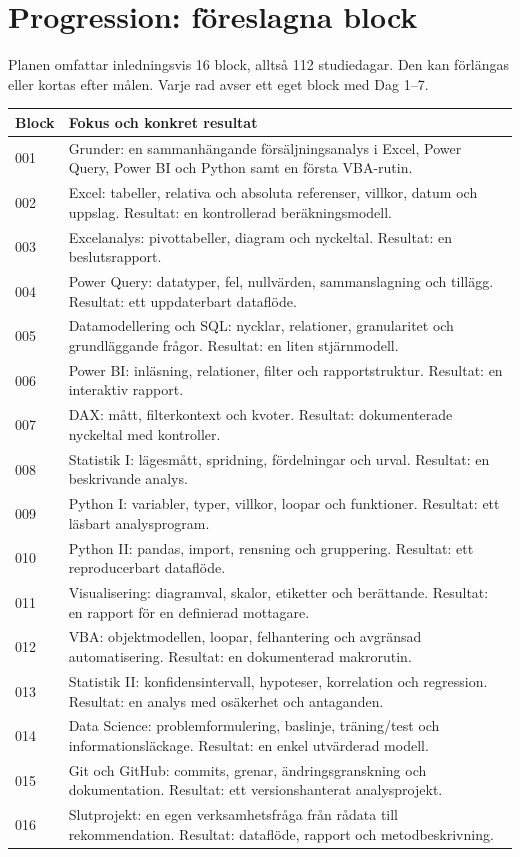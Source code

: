 \documentclass[11pt,a4paper]{article}
\begin{document}
\section{Progression: föreslagna block}
Planen omfattar inledningsvis 16 block, alltså 112 studiedagar. Den kan förlängas eller kortas efter målen. Varje rad avser ett eget block med Dag 1--7.
\begin{tabularx}{\textwidth}{@{}lX@{}}
\toprule
Block & Fokus och konkret resultat\\
\midrule
001 & Grunder: en sammanhängande försäljningsanalys i Excel, Power Query, Power BI och Python samt en första VBA-rutin.\\
002 & Excel: tabeller, relativa och absoluta referenser, villkor, datum och uppslag. Resultat: en kontrollerad beräkningsmodell.\\
003 & Excelanalys: pivottabeller, diagram och nyckeltal. Resultat: en beslutsrapport.\\
004 & Power Query: datatyper, fel, nullvärden, sammanslagning och tillägg. Resultat: ett uppdaterbart dataflöde.\\
005 & Datamodellering och SQL: nycklar, relationer, granularitet och grundläggande frågor. Resultat: en liten stjärnmodell.\\
006 & Power BI: inläsning, relationer, filter och rapportstruktur. Resultat: en interaktiv rapport.\\
007 & DAX: mått, filterkontext och kvoter. Resultat: dokumenterade nyckeltal med kontroller.\\
008 & Statistik I: lägesmått, spridning, fördelningar och urval. Resultat: en beskrivande analys.\\
009 & Python I: variabler, typer, villkor, loopar och funktioner. Resultat: ett läsbart analysprogram.\\
010 & Python II: pandas, import, rensning och gruppering. Resultat: ett reproducerbart dataflöde.\\
011 & Visualisering: diagramval, skalor, etiketter och berättande. Resultat: en rapport för en definierad mottagare.\\
012 & VBA: objektmodellen, loopar, felhantering och avgränsad automatisering. Resultat: en dokumenterad makrorutin.\\
013 & Statistik II: konfidensintervall, hypoteser, korrelation och regression. Resultat: en analys med osäkerhet och antaganden.\\
014 & Data Science: problemformulering, baslinje, träning/test och informationsläckage. Resultat: en enkel utvärderad modell.\\
015 & Git och GitHub: commits, grenar, ändringsgranskning och dokumentation. Resultat: ett versionshanterat analysprojekt.\\
016 & Slutprojekt: en egen verksamhetsfråga från rådata till rekommendation. Resultat: dataflöde, rapport och metodbeskrivning.\\
\bottomrule
\end{tabularx}
\end{document}
